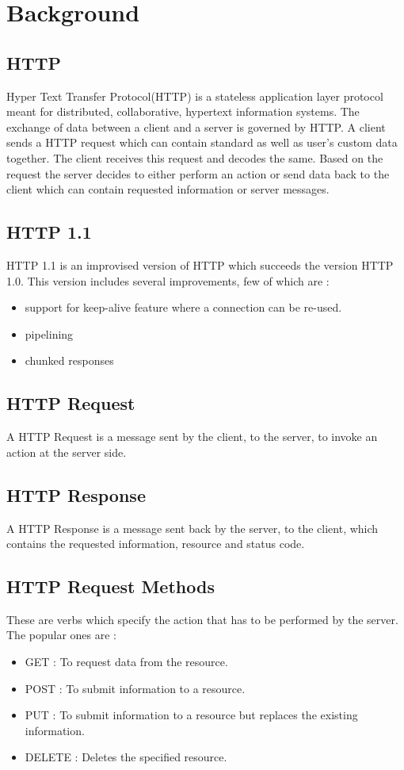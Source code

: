 \chapter{Background}
\section{HTTP} 
\cite{b1} Hyper Text Transfer Protocol(HTTP) is a stateless application layer protocol meant for distributed, collaborative, hypertext information systems. The exchange of data between a client and a server is governed by HTTP. A client sends a HTTP request which can contain standard as well as user's custom data together. The client receives this request and decodes the same. Based on the request the server decides to either perform an action or send data back to the client which can contain requested information or server messages.  

\section{HTTP 1.1}
\cite{b1} HTTP 1.1 is an improvised version of HTTP which succeeds the version HTTP 1.0. This version includes several improvements, few of which are :
\begin{itemize}
	\item support for keep-alive feature where a connection can be re-used.
	\item pipelining
	\item chunked responses
\end{itemize} 

\section{HTTP Request}
\cite{b7}A HTTP Request is a message sent by the client, to the server, to invoke an action at the server side.

\section{HTTP Response}
\cite{b7}A HTTP Response is a message sent back by the server, to the client, which contains the requested information, resource and status code. 

\section{HTTP Request Methods}
\cite{b8}These are verbs which specify the action that has to be performed by the server. The popular ones are :
\begin{itemize}
	\item GET : To request data from the resource.
	\item POST : To submit information to a resource. 
	\item PUT : To submit information to a resource but replaces the existing information. 
	\item DELETE : Deletes the specified resource. 
\end{itemize}

